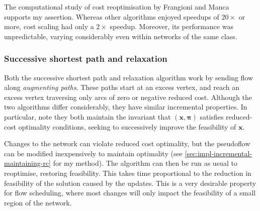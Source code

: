 The computational study of cost reoptimisation by Frangioni and Manca~\cite{Frangioni:2006} supports my assertion. Whereas other algorithms enjoyed speedups of $20\times$ or more, cost scaling had only a $2\times$ speedup. Moreover, its performance was unpredictable, varying considerably even within networks of the same class.

\subsubsection{Successive shortest path and relaxation}

Both the successive shortest path and relaxation algorithm work by sending flow along \emph{augmenting paths}. These paths start at an excess vertex, and reach an excess vertex traversing only arcs of zero or negative reduced cost. Although the two algorithms differ considerably, they have similar incremental properties. In particular, note they both maintain the invariant that $\left(\mathbf{x},\boldsymbol{\pi}\right)$ satisfies reduced-cost optimality conditions, seeking to successively improve the feasibility of $\mathbf{x}$\footnotemark.

Changes to the network can violate reduced cost optimality, but the pseudoflow can be modified inexpensively to maintain optimality (see \cref{sec:impl-incremental-maintaining-rc} for my method). The algorithm can then be run as usual to reoptimise, restoring feasibility. This takes time proportional to the reduction in feasibility of the solution caused by the updates\footnotemark. This is a very desirable property for flow scheduling, where most changes will only impact the feasibility of a small region of the network.

